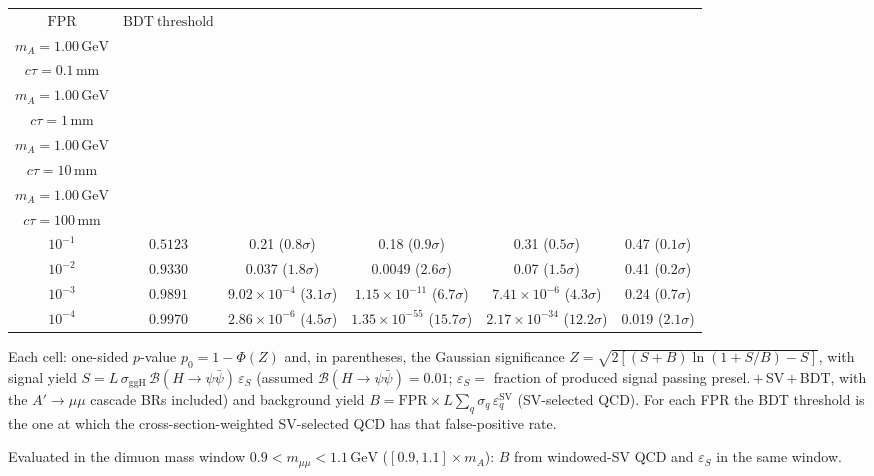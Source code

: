 \documentclass[10pt,a4paper]{article}
\begin{document}
{\begin{tabular}{cccccc}
\toprule
$\mathrm{FPR}$ & $\mathrm{BDT\ threshold}$ & \shortstack{$m_{\pi}=10\,\mathrm{GeV}$\\$m_{A}=1.00\,\mathrm{GeV}$\\$c\tau=0.1\,\mathrm{mm}$} & \shortstack{$m_{\pi}=10\,\mathrm{GeV}$\\$m_{A}=1.00\,\mathrm{GeV}$\\$c\tau=1\,\mathrm{mm}$} & \shortstack{$m_{\pi}=10\,\mathrm{GeV}$\\$m_{A}=1.00\,\mathrm{GeV}$\\$c\tau=10\,\mathrm{mm}$} & \shortstack{$m_{\pi}=10\,\mathrm{GeV}$\\$m_{A}=1.00\,\mathrm{GeV}$\\$c\tau=100\,\mathrm{mm}$} \\
\midrule
$10^{-1}$ & $0.5123$ & 0.21 ($0.8\sigma$) & 0.18 ($0.9\sigma$) & 0.31 ($0.5\sigma$) & 0.47 ($0.1\sigma$)\\
$10^{-2}$ & $0.9330$ & 0.037 ($1.8\sigma$) & 0.0049 ($2.6\sigma$) & 0.07 ($1.5\sigma$) & 0.41 ($0.2\sigma$)\\
$10^{-3}$ & $0.9891$ & $9.02\times10^{-4}$ ($3.1\sigma$) & $1.15\times10^{-11}$ ($6.7\sigma$) & $7.41\times10^{-6}$ ($4.3\sigma$) & 0.24 ($0.7\sigma$)\\
$10^{-4}$ & $0.9970$ & $2.86\times10^{-6}$ ($4.5\sigma$) & $1.35\times10^{-55}$ ($15.7\sigma$) & $2.17\times10^{-34}$ ($12.2\sigma$) & 0.019 ($2.1\sigma$)\\
\bottomrule
\end{tabular}

{\small Each cell: one-sided $p$-value $p_0=1-\Phi(Z)$ and, in parentheses, the Gaussian significance $Z=\sqrt{2\left[(S{+}B)\ln(1{+}S/B)-S\right]}$, with signal yield $S=L\,\sigma_{\mathrm{ggH}}\,\mathcal{B}(H\to\psi\bar{\psi})\,\varepsilon_S$ (assumed $\mathcal{B}(H\to\psi\bar{\psi})=0.01$; $\varepsilon_S=$ fraction of produced signal passing presel.\,$+$\,SV\,$+$\,BDT, with the $A'\to\mu\mu$ cascade BRs included) and background yield $B=\mathrm{FPR}\times L\sum_q\sigma_q\,\varepsilon_q^{\mathrm{SV}}$ (SV-selected QCD). For each FPR the BDT threshold is the one at which the cross-section-weighted SV-selected QCD has that false-positive rate.}

{\small Evaluated in the dimuon mass window $0.9<m_{\mu\mu}<1.1\,\mathrm{GeV}$ ($[0.9,1.1]\times m_A$): $B$ from windowed-SV QCD and $\varepsilon_S$ in the same window.}

}\clearpage
\end{document}
